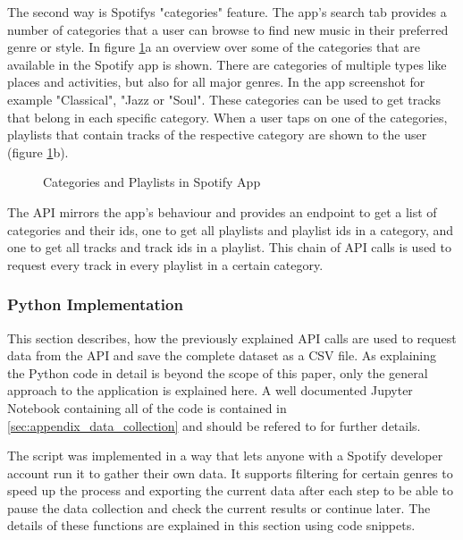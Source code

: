 The second way is Spotifys "categories" feature. The app's search tab provides a number of
categories that a user can browse to find new music in their preferred genre or style.
In figure \ref{fig:Categories and Playlists in Spotify App}a an overview over some of the categories
that are available in the Spotify app is shown. There are categories of multiple types like
places and activities, but also for all major genres. In the app screenshot
for example "Classical", "Jazz or "Soul".
These categories can be used to get tracks that belong in each specific category. When a user taps on
one of the categories, playlists that contain tracks of the respective category are shown to the user
(figure \ref{fig:Categories and Playlists in Spotify App}b).

\begin{figure}[H]
    \centering
    \qquad
    \caption{Categories and Playlists in Spotify App}%
    \label{fig:Categories and Playlists in Spotify App}%
\end{figure}

The API mirrors the app's behaviour and provides an endpoint to get a list of categories and their ids,
one to get all playlists and playlist ids in a category, and one to get all tracks and track ids in
a playlist. This chain of API calls is used to request every track in every playlist in a certain category.


\subsubsection{Python Implementation}

This section describes, how the previously explained API calls are used to request data from the API
and save the complete dataset as a CSV file.
As explaining the Python code in detail is beyond the scope of this paper, only the general 
approach to the application is explained here. 
A well documented Jupyter Notebook containing all of the code is contained in \ref{sec:appendix_data_collection} and should be
refered to for further details.

The script was implemented in a way that lets anyone with a Spotify
developer account run it to gather their own data.
It supports filtering for certain genres to speed up the process and exporting the current data after each step
to be able to pause the data collection and check the current results or continue later.
The details of these functions are explained in this section using code snippets.

